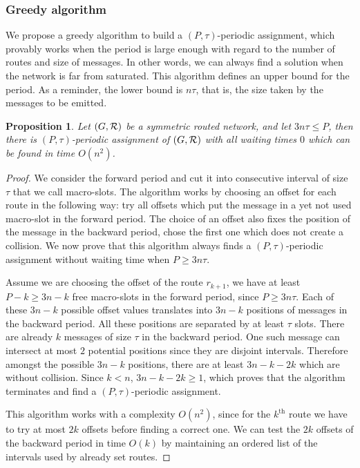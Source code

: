 \documentclass[10pt, conference, letterpaper]{IEEEtran}
\newtheorem{proposition}{Proposition}
\begin{document}
   
    \subsubsection*{Greedy algorithm}
    
    We propose a greedy algorithm to build a $(P,\tau)$-periodic assignment, which provably works when
    the period is large enough with regard to the number of routes and size of messages. In other words, 
    we can always find a solution when the network is far from saturated. This algorithm defines an upper bound for the period. As a reminder, the lower bound is $n\tau$, that is, the size taken by the messages to be emitted.
    
    \begin{proposition}
     Let $(G, {\cal R})$ be a symmetric routed network, and let $ 3n\tau \leq P$, then there is $(P,\tau)$-periodic assignment of $(G, {\cal R})$ with all waiting times $0$ which can be found in time $O(n^2)$.
    \end{proposition}
    \begin{proof}
     We consider the forward period and cut it into consecutive interval of size $\tau$ that we call macro-slots. The algorithm works by choosing an offset for each route in the following way: try all offsets which put the message in a yet not used macro-slot in the forward
     period. The choice of an offset also fixes the position of the message in the backward period, chose the first one which does not create a collision. We now prove that this algorithm always finds a $(P,\tau)$-periodic assignment without waiting time when $P \geq 3n\tau$.
     
     Assume we are choosing the offset of the route $r_{k+1}$, we have at least $P - k \geq 3n - k$ free macro-slots in the forward period, since $P \geq 3n\tau$. Each of these $3n - k$ possible offset values translates into $3n - k$ positions of messages in the backward period. All these positions are separated by at least $\tau$ slots. There are already $k$ messages of size $\tau$ in the backward period. One such message can intersect at most $2$ potential positions since they are disjoint intervals. Therefore  amongst the possible $3n - k$ positions, there are  at least $3n - k -2k$ which are without collision. Since $k < n$, $3n - k -2k \geq 1$, which proves that the algorithm terminates and find a  $(P,\tau)$-periodic assignment. 
     
     This algorithm works with a complexity $O(n^2)$, since for the $k^{\text{th}}$ route we have to try at most $2k$ offsets before finding a correct one. We can test the $2k$ offsets of the backward period in time $O(k)$ by maintaining an ordered list of the intervals used by already set routes.
     \end{proof}
     
\end{document}
